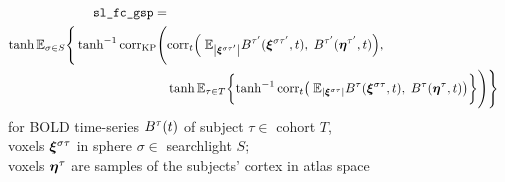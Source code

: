 \documentclass[10pt]{article}
\begin{document}
\begin{equation*}
\begin{split}
  \texttt{sl\_fc\_gsp} = \\
  \hyptangent
  \mathbb{E}_{\sigma \in S} \Bigg\{ 
  \hyptangent^{-1}
  \text{corr}_{\text{KP}} \Bigg( &
            \text{corr}_t\qty( \;
                       \mathbb{E}_{\qty|\vb*{\xi}^{\sigma\tau'}|} B^{\tau'}(\vb*{\xi}^{\sigma\tau'}, t), \; 
                       B^{\tau'}(\vb*{\eta}^{\tau'}, t) ), \; \\
          & \hyptangent
            \mathbb{E}_{\tau \in T} \qty\bigg{ 
            \hyptangent^{-1}
            \text{corr}_t\qty\big( \; 
                       \mathbb{E}_{\qty|\vb*{\xi}^{\sigma\tau}|}B^\tau(\vb*{\xi}^{\sigma\tau}, t), \;
                       B^\tau(\vb*{\eta}^\tau, t) ) }
            \Bigg) \Bigg\} 
\end{split}            
\end{equation*}
for BOLD time-series $B^\tau\qty(t)$ of subject $\tau \in$ cohort $T$, \\
voxels $\vb*{\xi}^{\sigma\tau}$ in sphere $\sigma \in$ searchlight $S$; \\
voxels $\vb*{\eta}^\tau$ are samples of the subjects' cortex in atlas space
\end{document}
